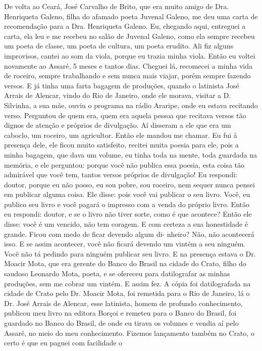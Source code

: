 De volta ao Ceará, José Carvalho de Brito, que era muito amigo de Dra.
Henriqueta Galeno, filha do afamado poeta Juvenal Galeno, me deu uma
carta de recomendação para a Dra. Henriqueta Galeno. Eu, chegando
aqui, entreguei a carta, ela leu e me recebeu no salão de Juvenal
Galeno, como ela sempre recebeu um poeta de classe, um poeta de cultura,
um poeta erudito. Ali fiz alguns improvisos, cantei ao som da viola,
porque eu trazia minha viola. Então eu voltei novamente ao Assaré, 5
meses e tantos dias. Cheguei lá, recomecei a minha vida de roceiro,
sempre trabalhando e sem nunca mais viajar, porém sempre fazendo
versos. E já tinha uma farta bagagem de produções, quando o latinista
José Arrais de Alencar, vindo do Rio de Janeiro, onde ele morava,
visitar a D. Silvinha, a sua mãe, ouviu o programa na rádio Araripe,
onde eu estava recitando verso.
Perguntou de quem era, quem era aquela pessoa que recitava versos tão
dignos de atenção e próprios de divulgação. Aí disseram a ele que era um
caboclo, um roceiro, um agricultor. Então ele mandou me chamar. Eu fui
à presença dele, ele ficou muito satisfeito, recitei muita poesia para
ele, pois a minha bagagem, que dava um volume, eu tinha toda na mente,
toda guardada na memória, e ele perguntou: porque você não publica
essa poesia, esta coisa tão admirável que você tem, tantos versos
próprios de divulgação! Eu respondi: doutor, porque eu não posso, eu sou
pobre, sou roceiro, nem sequer nunca pensei em publicar alguma coisa.
Ele disse: pois você vai publicar o seu livro. Você, eu publico seu
livro e você pagará o impresso com a venda do próprio livro. Então eu
respondi: doutor, e se o livro não tiver sorte, como é que acontece?
Então ele disse: você é um vencido, não tem coragem. E com certeza a sua
honestidade é grande. Ficou com medo de ficar devendo algum di-
nheiro? Não, não acontecerá isso. E se assim acontecer, você não ficará
devendo um vintém a seu ninguém. Você não tá pedindo para ninguém
publicar seu livro. E na presença estava o Dr. Moacir Mota, que era
gerente do Banco do Brasil na cidade do Crato, filho do saudoso Leonardo
Mota, poeta, e se ofereceu para datilografar as minhas produções, sem me
cobrar um vintém. E assim fez. A cópia foi datilografada na cidade de
Crato pelo Dr. Moacir Mota, foi remetida para o Rio de Janeiro, lá o
Dr. José Arrais de Alencar, esse latinista, homem de profundo
conhecimento, publicou meu livro na editora Borçoi e remeteu para o
Banco do Brasil, foi guardado no Banco do Brasil, de onde eu tirava os
volumes e vendia aí pelo Assaré, no meio do meu conhecimento. Fizemos
lançamento também no Crato, o certo é que eu paguei com facilidade o
